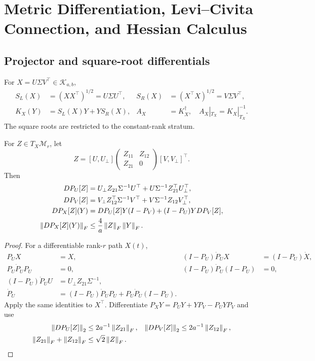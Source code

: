\section{Metric Differentiation, Levi--Civita Connection, and Hessian Calculus}
\label{app:rigid-calculus}
\subsection{Projector and square-root differentials}
\begin{definition}
For $X=U\Sigma V^\top\in\mathcal K_{a,b}$,
\begin{align}
S_L(X)&=(XX^\top)^{1/2}=U\Sigma U^\top,&
S_R(X)&=(X^\top X)^{1/2}=V\Sigma V^\top,\\
K_X(Y)&=S_L(X)Y+YS_R(X),&
A_X&=K_X^\dagger,\quad A_X|_{T_X}=K_X|_{T_X}^{-1}.
\end{align}
The square roots are restricted to the constant-rank stratum.
\end{definition}

\begin{lemma}
For $Z\in T_X\mathcal M_r$, let
\begin{equation}
Z=[U,U_\perp]\begin{pmatrix}Z_{11}&Z_{12}\\Z_{21}&0\end{pmatrix}
[V,V_\perp]^\top .
\end{equation}
Then
\begin{align}
DP_U[Z]&=U_\perp Z_{21}\Sigma^{-1}U^\top
+U\Sigma^{-1}Z_{21}^\top U_\perp^\top,\\
DP_V[Z]&=V_\perp Z_{12}^\top\Sigma^{-1}V^\top
+V\Sigma^{-1}Z_{12}V_\perp^\top,\\
DP_X[Z](Y)
&=DP_U[Z]Y(I-P_V)+(I-P_U)YDP_V[Z],\\
\left\lVert DP_X[Z](Y)\right\rVert_F
&\leq \frac4a\left\lVert Z\right\rVert_F\left\lVert Y\right\rVert_F .
\label{eq:rigid-projector-derivative}
\end{align}
\end{lemma}
\begin{proof}
For a differentiable rank-$r$ path $X(t)$,
\begin{align}
P_UX&=X,&
(I-P_U)\dot P_U X&=(I-P_U)\dot X,\\
P_U\dot P_UP_U&=0,&
(I-P_U)\dot P_U(I-P_U)&=0,\\
(I-P_U)\dot P_UU&=U_\perp Z_{21}\Sigma^{-1},\\
\dot P_U&=(I-P_U)\dot P_UP_U+
P_U\dot P_U(I-P_U).
\end{align}
Apply the same identities to $X^\top$. Differentiate
$P_XY=P_UY+YP_V-P_UYP_V$ and use
\begin{align}
\left\lVert DP_U[Z]\right\rVert_2&\leq2a^{-1}\left\lVert Z_{21}\right\rVert_F,&
\left\lVert DP_V[Z]\right\rVert_2&\leq2a^{-1}\left\lVert Z_{12}\right\rVert_F,\\
\left\lVert Z_{21}\right\rVert_F+\left\lVert Z_{12}\right\rVert_F&\leq\sqrt2\left\lVert Z\right\rVert_F .
\end{align}
\end{proof}

